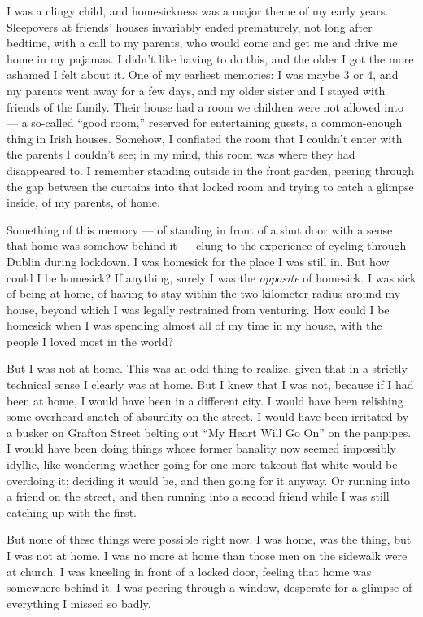 I was a clingy child, and homesickness was a major theme of my early
years. Sleepovers at friends' houses invariably ended prematurely, not
long after bedtime, with a call to my parents, who would come and get me
and drive me home in my pajamas. I didn't like having to do this, and
the older I got the more ashamed I felt about it. One of my earliest
memories: I was maybe 3 or 4, and my parents went away for a few days,
and my older sister and I stayed with friends of the family. Their house
had a room we children were not allowed into --- a so-called ``good
room,'' reserved for entertaining guests, a common-enough thing in Irish
houses. Somehow, I conflated the room that I couldn't enter with the
parents I couldn't see; in my mind, this room was where they had
disappeared to. I remember standing outside in the front garden, peering
through the gap between the curtains into that locked room and trying to
catch a glimpse inside, of my parents, of home.

Something of this memory --- of standing in front of a shut door with a
sense that home was somehow behind it --- clung to the experience of
cycling through Dublin during lockdown. I was homesick for the place I
was still in. But how could I be homesick? If anything, surely I was the
\emph{opposite} of homesick. I was sick of being at home, of having to
stay within the two-kilometer radius around my house, beyond which I was
legally restrained from venturing. How could I be homesick when I was
spending almost all of my time in my house, with the people I loved most
in the world?

But I was not at home. This was an odd thing to realize, given that in a
strictly technical sense I clearly was at home. But I knew that I was
not, because if I had been at home, I would have been in a different
city. I would have been relishing some overheard snatch of absurdity on
the street. I would have been irritated by a busker on Grafton Street
belting out ``My Heart Will Go On'' on the panpipes. I would have been
doing things whose former banality now seemed impossibly idyllic, like
wondering whether going for one more takeout flat white would be
overdoing it; deciding it would be, and then going for it anyway. Or
running into a friend on the street, and then running into a second
friend while I was still catching up with the first.

But none of these things were possible right now. I was home, was the
thing, but I was not at home. I was no more at home than those men on
the sidewalk were at church. I was kneeling in front of a locked door,
feeling that home was somewhere behind it. I was peering through a
window, desperate for a glimpse of everything I missed so badly.

